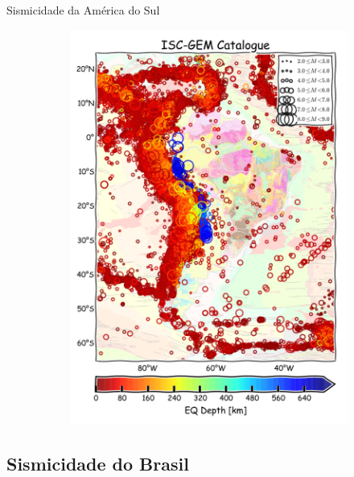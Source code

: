 \documentclass[ucs,8pt]{beamer}
\begin{document}
\begin{frame}{Sismicidade da América do Sul}
\begin{figure}[H]
\begin{subfigure}[t]{0.48\textwidth}
	  \includegraphics[width=.85\textwidth]{seismicity_sa} 
	  \label{fig:sa_seis} 
	\end{subfigure}
	\label{fig:eq_record}
\end{figure}
\end{frame}



\subsection{Sismicidade do Brasil}
\end{document}
